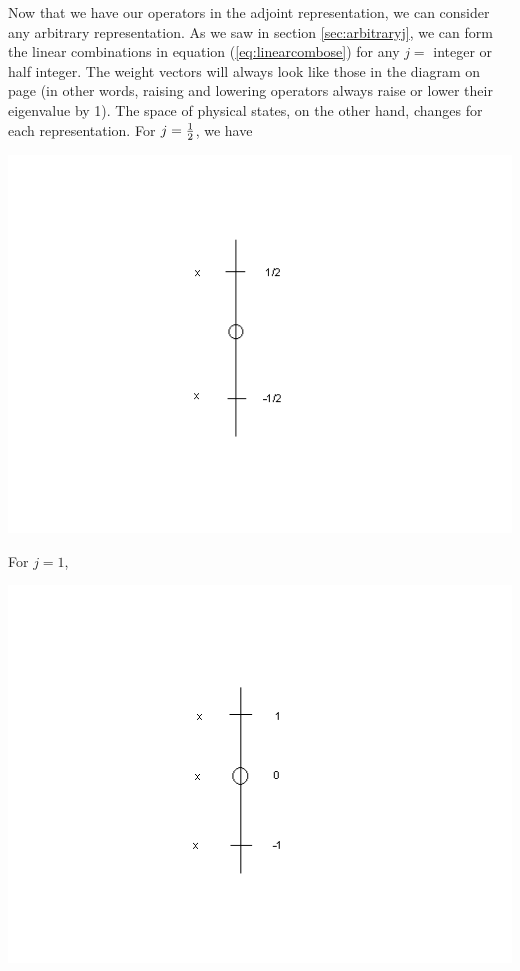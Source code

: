 \documentclass[12pt,epsf]{article}
\begin{document}
Now that we have our operators in the adjoint representation, we can
consider any arbitrary representation. As we saw in section
\ref{sec:arbitraryj}, we can form the linear combinations in equation
(\ref{eq:linearcombose}) for any $j=$ integer or half integer.	The
weight vectors will always look like those in the diagram on page
\pageref{su2picture} (in other words, raising and lowering operators
always raise or lower their eigenvalue by 1).  
\newpage
The space of physical states, on the other hand, changes for each
representation.  For $j={1\over 2}$, we have 
\begin{center}
\includegraphics[scale = .7]{su2jhalf.PNG}
\end{center}
For $j=1$,
\begin{center}
\includegraphics[scale = .7]{su2jone.PNG}
\end{center}
\end{document}
